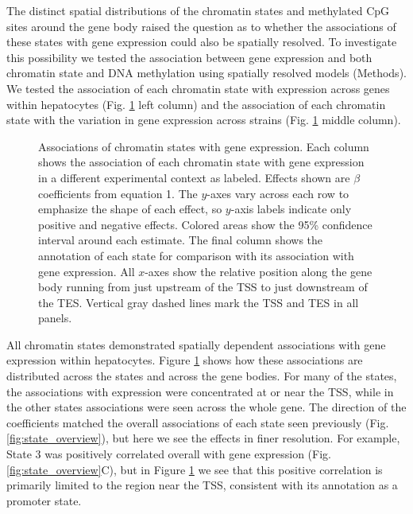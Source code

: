 \documentclass[
  11pt,
]{article}
\begin{document}
The distinct spatial distributions of the chromatin states and
methylated CpG sites around the gene body raised the question as to
whether the associations of these states with gene expression could also
be spatially resolved. To investigate this possibility we tested the
association between gene expression and both chromatin state and DNA
methylation using spatially resolved models (Methods). We tested the
association of each chromatin state with expression across genes within
hepatocytes (Fig. \ref{fig:state_effects} left column) and the
association of each chromatin state with the variation in gene
expression across strains (Fig. \ref{fig:state_effects} middle column).

\begin{figure}[ht!]
\caption{Associations of chromatin states with gene expression. Each 
column shows the association of each chromatin state with gene 
expression in a different experimental context as labeled. 
Effects shown are $\beta$ coefficients from equation 1. The 
$y$-axes vary across each row to emphasize the shape of each effect, 
so $y$-axis labels indicate only positive and negative effects. 
Colored areas show the 95\% confidence interval around each 
estimate. The final column shows the annotation of each state for 
comparison with its association with gene expression. All $x$-axes 
show the relative position along the gene body running from just 
upstream of the TSS to just downstream of the TES. Vertical gray 
dashed lines mark the TSS and TES in all panels.
}
\label{fig:state_effects}
\end{figure}

All chromatin states demonstrated spatially dependent associations with
gene expression within hepatocytes. Figure \ref{fig:state_effects} shows
how these associations are distributed across the states and across the
gene bodies. For many of the states, the associations with expression
were concentrated at or near the TSS, while in the other states
associations were seen across the whole gene. The direction of the
coefficients matched the overall associations of each state seen
previously (Fig. \ref{fig:state_overview}), but here we see the effects
in finer resolution. For example, State 3 was positively correlated
overall with gene expression (Fig. \ref{fig:state_overview}C), but in
Figure \ref{fig:state_effects} we see that this positive correlation is
primarily limited to the region near the TSS, consistent with its
annotation as a promoter state.
\end{document}
